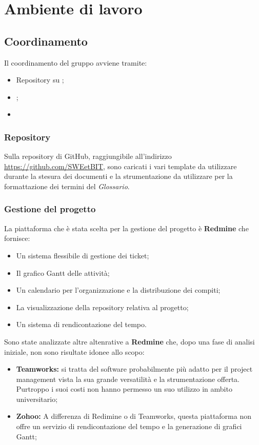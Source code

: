 \section{Ambiente di lavoro}
  \subsection{Coordinamento}
    Il coordinamento del gruppo avviene tramite:
    \begin{itemize}
      \item Repository su ;
      \item {};
      \item {}
    \end{itemize}
    \subsubsection{Repository}
      Sulla repository di GitHub, raggiungibile all'indirizzo \url{https://github.com/SWEetBIT}, sono caricati i vari template da utilizzare
      durante la stesura dei documenti e la strumentazione da utilizzare per la formattazione dei termini del \emph{Glossario}.
    \subsubsection{Gestione del progetto}
      La piattaforma che è stata scelta per la gestione del progetto è \textbf{Redmine} che fornisce:
      \begin{itemize}
        \item Un sistema flessibile di gestione dei ticket;
        \item Il grafico Gantt delle attività;
        \item Un calendario per l'organizzazione e la distribuzione dei compiti;
        \item La visualizzazione della repository relativa al progetto;
        \item Un sistema di rendicontazione del tempo.
      \end{itemize}
      Sono state analizzate altre altenrative a \textbf{Redmine} che, dopo una fase di analisi iniziale, non sono risultate idonee allo scopo:
      \begin{itemize}
        \item \textbf{Teamworks: }si tratta del software probabilmente più adatto per il project management vista la sua grande versatilità e
        la strumentazione offerta. Purtroppo i suoi costi non hanno permesso un suo utilizzo in ambito universitario;
        \item \textbf{Zohoo: }A differenza di Redimine o di Teamworks, questa piattaforma non offre un servizio di rendicontazione del tempo
        e la generazione di grafici Gantt;
      \end{itemize}
